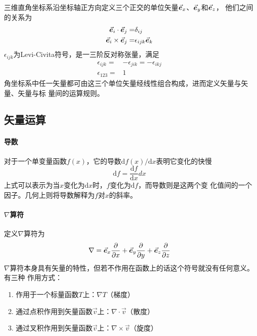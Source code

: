 三维直角坐标系沿坐标轴正方向定义三个正交的单位矢量$\vec{\bm{e}}_x$、$\vec{\bm{e}}_y$和$\vec{\bm{e}}_z$，
他们之间的关系为
\begin{equation}
    \begin{aligned}
        \vec{\bm{e}}_{i} \cdot  \vec{\bm{e}}_{j} =& \delta_{ij} \\
        \vec{\bm{e}}_{i} \times \vec{\bm{e}}_{j} =& \epsilon_{ijk} \vec{\bm{e}}_{k}
    \end{aligned}
    \label{eq:vec-cartesian}
\end{equation}
$\epsilon_{ijk}$为Levi-Civita符号，是一三阶反对称张量，满足
\begin{equation}
    \begin{aligned}
        \epsilon_{ijk} =& - \epsilon_{jik} = -\epsilon_{ikj} \\
        \epsilon_{123} =& 1
    \end{aligned}
    \label{eq:Levi-Civita}
\end{equation}
角坐标系中任一矢量都可由这三个单位矢量经线性组合构成，进而定义矢量与矢量、矢量与标
量间的运算规则。

\subsection{矢量运算}
\paragraph*{导数}
对于一个单变量函数$f(x)$，它的导数$\mathrm{d} f(x)/ \mathrm{d} x$表明它变化的快慢
\begin{equation}
    \mathrm{d} f = \frac{\mathrm{d} f}{\mathrm{d} x} dx
                                \label{eq:vec-derivative}
\end{equation}
上式可以表示为当$x$变化为$\mathrm{d}x$时，$f$变化为$\mathrm{d}f$，而导数则是这两个变
化值间的一个因子。几何上则将导数解释为$f$对$x$的斜率。

\paragraph*{$\nabla$算符}
定义$\nabla$算符为
\begin{equation}
    \nabla =    \vec{\bm{e}}_x \frac{\partial}{\partial x} 
               +\vec{\bm{e}}_y \frac{\partial}{\partial y}
               +\vec{\bm{e}}_z \frac{\partial}{\partial z}
    \label{eq:def-nabla-cartesian}
\end{equation}
$\nabla$算符本身具有矢量的特性，但若不作用在函数上的话这个符号就没有任何意义。有三种
作用方式：
\begin{enumerate}
    \item 作用于一个标量函数$T$上：$\nabla T$（梯度）
    \item 通过点积作用到矢量函数$\vec{v}$上：$\nabla \cdot \vec{v}$（散度）
    \item 通过叉积作用到矢量函数$\vec{v}$上：$\nabla \times \vec{v}$（旋度）
\end{enumerate}

